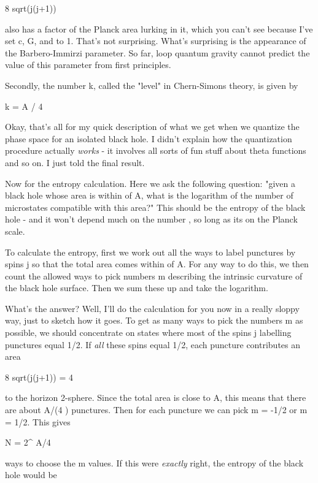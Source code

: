                       8 \pi  \gamma  sqrt(j(j+1))

also has a factor of the Planck area lurking in it, which you can't 
see because I've set c, G, and \hbar  to 1.  That's not surprising.  
What's surprising is the appearance of the Barbero-Immirzi parameter.  
So far, loop quantum gravity cannot predict the value of this parameter 
from first principles.

Secondly, the number k, called the "level" in Chern-Simons theory, is
given by

                      k = A / 4 \pi  \gamma 

Okay, that's all for my quick description of what we get when we quantize
the phase space for an isolated black hole.  I didn't explain how the 
quantization procedure actually \emph{works} - it involves all sorts of fun 
stuff about theta functions and so on.  I just told the final result.

Now for the entropy calculation.  Here we ask the following question: 
"given a black hole whose area is within \epsilon  of A, what is the 
logarithm of the number of microstates compatible with this area?"  
This should be the entropy of the black hole - and it won't depend
much on the number \epsilon , so long as its on the Planck scale.    

To calculate the entropy, first we work out all the ways to label
punctures by spins j so that the total area comes within \epsilon  of A.
For any way to do this, we then count the allowed ways to pick numbers
m describing the intrinsic curvature of the black hole surface.  Then
we sum these up and take the logarithm.  

What's the answer?  Well, I'll do the calculation for you now in a
really sloppy way, just to sketch how it goes.  To get as many ways
to pick the numbers m as possible, we should concentrate on states 
where most of the spins j labelling punctures equal 1/2.  If \emph{all} 
these spins equal 1/2, each puncture contributes an area

          8 \pi  \gamma  sqrt(j(j+1)) =  4 \pi  \gamma  {}

to the horizon 2-sphere.  Since the total area is close to A, this 
means that there are about A/(4 \pi  \gamma  {}) punctures.  Then
for each puncture we can pick m = -1/2 or m = 1/2.  This gives 

                     N = 2^{ A/4 \pi  \gamma  {}}

ways to choose the m values.  If this were \emph{exactly} right, the entropy
of the black hole would be

